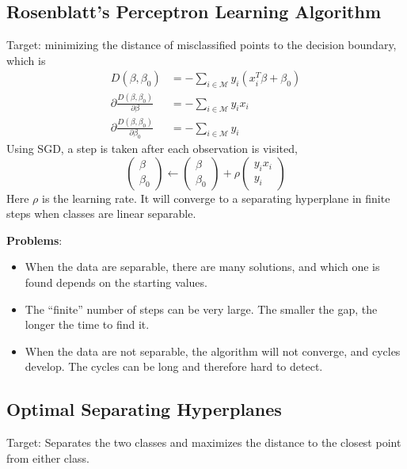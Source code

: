 \subsection{Rosenblatt's Perceptron Learning Algorithm}
Target: minimizing the distance of misclassified points to the decision boundary, 
which is
\begin{align*}
D\left(\beta, \beta_{0}\right)&
=-\sum_{i \in \mathcal{M}} y_{i}\left(x_{i}^{T}\beta+\beta_{0}\right)\\
\partial \frac{D\left(\beta, \beta_{0}\right)}{\partial \beta}&
=-\sum_{i \in \mathcal{M}} y_{i} x_{i} \\ 
\partial \frac{D\left(\beta, \beta_{0}\right)}{\partial \beta_{0}}&
=-\sum_{i \in \mathcal{M}} y_{i}
\end{align*}
Using SGD, a step is taken after each observation is visited, 
\begin{equation*}
\left(\begin{array}{l}{\beta} \\ {\beta_{0}}\end{array}\right) \leftarrow
\left(\begin{array}{l}{\beta} \\ {\beta_{0}}\end{array}\right)+
\rho\left(\begin{array}{c}{y_{i} x_{i}} \\ {y_{i}}\end{array}\right)
\end{equation*}
Here $\rho$ is the learning rate. It will converge to a separating hyperplane in finite
steps when classes are linear separable. 

\noindent\textbf{Problems}: 
\begin{itemize}
\item When the data are separable, there are many solutions, and which
one is found depends on the starting values.
\item The “finite” number of steps can be very large. The smaller the gap,
the longer the time to find it.
\item When the data are not separable, the algorithm will not converge,
and cycles develop. The cycles can be long and therefore hard to detect.
\end{itemize}

\subsection{Optimal Separating Hyperplanes}
Target: Separates the two classes and maximizes the distance to the closest point 
from either class. 


